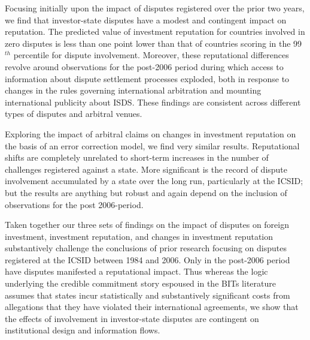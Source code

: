 \documentclass[12pt,onesided]{amsart}
\begin{document}
Focusing initially upon the impact of disputes registered over the prior two years, we find that investor-state disputes have a modest and contingent impact on reputation. The predicted value of investment reputation for countries involved in zero disputes is less than one point lower than that of countries scoring in the 99$^{th}$ percentile for dispute involvement. Moreover, these reputational differences revolve around observations for the post-2006 period during which access to information about dispute settlement processes exploded, both in response to changes in the rules governing international arbitration and mounting international publicity about ISDS. These findings are consistent across different types of disputes and arbitral venues. 

Exploring the impact of arbitral claims on changes in investment reputation on the basis of an error correction model, we find very similar results. Reputational shifts are completely unrelated to short-term increases in the number of challenges registered against a state. More significant is the record of dispute involvement accumulated by a state over the long run, particularly at the ICSID; but the results are anything but robust and again depend on the inclusion of observations for the post 2006-period. 

Taken together our three sets of findings on the impact of disputes on foreign investment, investment reputation, and changes in investment reputation substantively challenge the conclusions of prior research focusing on disputes registered at the ICSID between 1984 and 2006. Only in the post-2006 period have disputes manifested a reputational impact. Thus whereas the logic underlying the credible commitment story espoused in the BITs literature assumes that states incur statistically and substantively significant costs from allegations that they have violated their international agreements, we show that the effects of involvement in investor-state disputes are contingent on institutional design and information flows. 

\end{document}
